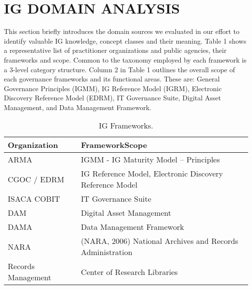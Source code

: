 \section{IG DOMAIN ANALYSIS}
\label{sec:domainanalysis}
This section briefly introduces the domain sources we evaluated in our effort to identify valuable IG knowledge, concept classes and their meaning. Table 1 shows a representative list of practitioner organizations and public agencies, their frameworks and scope. Common to the taxonomy employed by each framework is a 3-level category structure. Column 2 in Table 1 outlines the overall scope of each governance frameworks and its functional areas. These are: General Governance Principles (IGMM), IG Reference Model (IGRM), Electronic Discovery Reference Model (EDRM), IT Governance Suite, Digital Asset Management, and Data Management Framework.
\begin{table}[h]
\caption{IG Frameworks.}
\label{tab:example1} \centering
\scalebox{0.55} {\begin{tabular} {|l|l|}
  \hline
  Organization & Framework\/Scope\\
  \hline
  ARMA & {IGMM - IG Maturity Model – Principles}\\
  \hline
  {CGOC / EDRM} & {IG Reference Model, Electronic Discovery Reference Model}\\
  \hline
  {ISACA	COBIT} & {IT Governance Suite} \\
  \hline
  {DAM}	& {Digital Asset Management} \\
  \hline
  {DAMA} 	& {Data Management Framework} \\
  \hline
  {NARA } &  {(NARA, 2006) National Archives and Records Administration} \\
  \hline 
  {Records Management}  & {Center of Research Libraries} \\
  \hline
 \end{tabular}}
\end{table}
%
